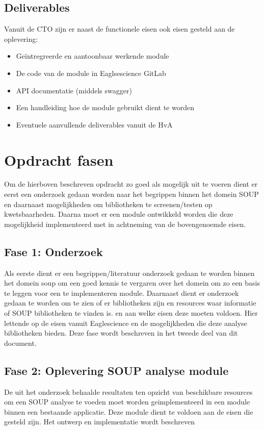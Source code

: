 \subsection{Deliverables}
Vanuit de CTO zijn er naast de functionele eisen ook eisen gesteld aan de oplevering:
\begin{itemize}
\item Geïntregreerde en aantoonbaar werkende module
\item De code van de module in Eaglsescience GitLab
\item API documentatie (middels swagger)
\item Een handleiding hoe de module gebruikt dient te worden
\item Eventuele aanvullende deliverables vanuit de HvA
\end{itemize}


\section{Opdracht fasen}
Om de hierboven beschreven opdracht zo goed als mogelijk uit te voeren dient er eerst een onderzoek gedaan worden naar het begrippen binnen het domein SOUP en daarnaast mogelijkheden om bibliotheken te screenen/testen op kwetsbaarheden. Daarna moet er een module ontwikkeld worden die deze mogelijkheid implementeerd met in achtneming van de bovengenoemde eisen. 
\subsection{Fase 1: Onderzoek}
Als eerste dient er een begrippen/literatuur onderzoek gedaan te worden binnen het domein soup om een goed kennis te vergaren over het domein om zo een basis te leggen voor een te implementeren module. Daarnaast dient er onderzoek gedaan te worden om te zien of er bibliotheken zijn en resources waar informatie of SOUP bibliotheken te vinden is. en aan welke eisen deze moeten voldoen. Hier lettende op de eisen vanuit Eaglescience en de mogelijkheden die deze analyse bibliotheken bieden. Deze fase wordt beschreven in het tweede deel van dit document. 

\subsection{Fase 2: Oplevering SOUP analyse module}
De uit het onderzoek behaalde resultaten ten opzicht van beschikbare resources om een SOUP analyse te voeden moet worden geimplementeerd in een module binnen een bestaande applicatie. Deze module dient te voldoen aan de eisen die gesteld zijn. Het ontwerp en implementatie wordt beschreven 

